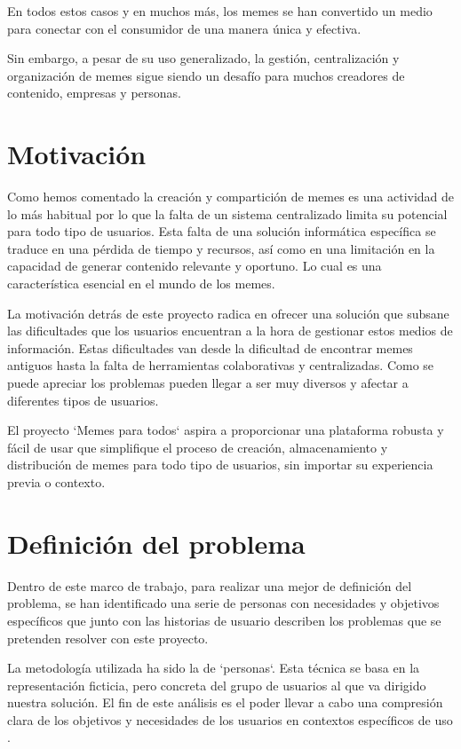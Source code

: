 En todos estos casos y en muchos más, los memes se han convertido un medio para conectar con el consumidor de una manera única y efectiva.

Sin embargo, a pesar de su uso generalizado, la gestión, centralización y organización de memes sigue siendo un desafío para muchos creadores de contenido, empresas y personas.

\section{Motivación}

Como hemos comentado la creación y compartición de memes es una actividad de lo más habitual por lo que la falta de un sistema centralizado limita su potencial para todo tipo de usuarios. Esta falta de una solución informática específica se traduce en una pérdida de tiempo y recursos, así como en una limitación en la capacidad de generar contenido relevante y oportuno. Lo cual es una característica esencial en el mundo de los memes.

La motivación detrás de este proyecto radica en ofrecer una solución que subsane las dificultades que los usuarios encuentran a la hora de gestionar estos medios de información. Estas dificultades van desde la dificultad de encontrar memes antiguos hasta la falta de herramientas colaborativas y centralizadas. Como se puede apreciar los problemas pueden llegar a ser muy diversos y afectar a diferentes tipos de usuarios.

El proyecto `Memes para todos` aspira a proporcionar una plataforma robusta y fácil de usar que simplifique el proceso de creación, almacenamiento y distribución de memes para todo tipo de usuarios, sin importar su experiencia previa o contexto.

\section{Definición del problema}

Dentro de este marco de trabajo, para realizar una mejor de definición del problema, se han identificado una serie de personas con necesidades y objetivos específicos que junto con las historias de usuario describen los problemas que se pretenden resolver con este proyecto.

La metodología utilizada ha sido la de `personas`. Esta técnica se basa en la representación ficticia, pero concreta del grupo de usuarios al que va dirigido nuestra solución. El fin de este análisis es el poder llevar a cabo una compresión clara de los objetivos y necesidades de los usuarios en contextos específicos de uso \cite{cooper2014face}.

